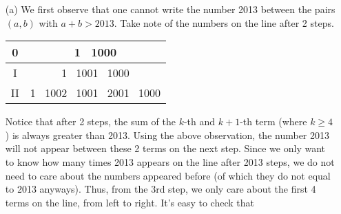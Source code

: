 \documentclass[11pt]{article}
\begin{document}
        \begin{solution}
            \hfill
            \begin{enumerate}
                \item[(a)] We first observe that one cannot write the number 2013 between the pairs \((a,b)\) with \(a + b > 2013\). Take note of the numbers on the line after 2 steps.
                
                \boom
                
                \begin{center}
                    \begin{tabular}{ |c|c| } 
                        \hline
                        0 & 1 \ 1000 \\
                        \hline
                        I & 1 \ 1001 \ 1000 \\ 
                        \hline
                        II & 1 \ 1002 \ 1001 \ 2001 \ 1000 \\ 
                        \hline
                    \end{tabular}
                \end{center}
                
                \boom
                
                Notice that after 2 steps, the sum of the \(k\)-th and \(k + 1\)-th term (where \(k \geq 4\)) is always greater than 2013. Using the above observation, the number 2013 will not appear between these 2 terms on the next step. Since we only want to know how many times 2013 appears on the line after 2013 steps, we do not need to care about the numbers appeared before (of which they do not equal to 2013 anyways). Thus, from the 3rd step, we only care about the first 4 terms on the line, from left to right. It's easy to check that
                
                \boom
                

\end{enumerate}
\end{solution}
\end{document}
